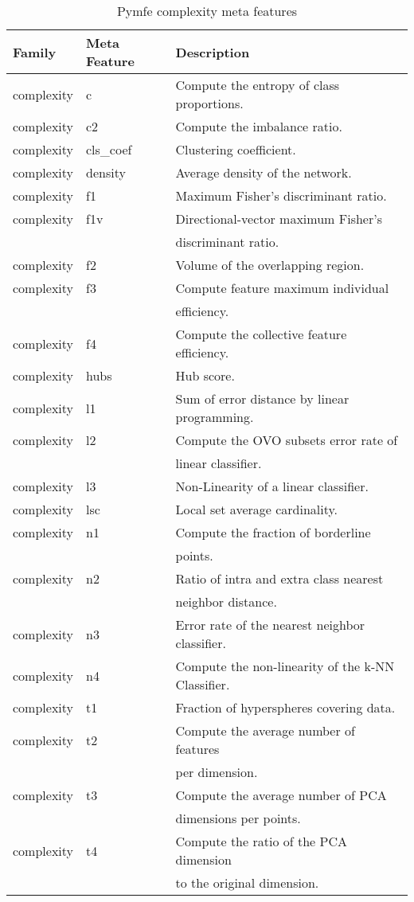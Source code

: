   \begin{table}[h!]
    \centering
    \caption{Pymfe complexity meta features}
    \setlength{\tabcolsep}{8pt}
      \renewcommand{\arraystretch}{1.2}
        \begin{tabular}{lll}
        \hline
        Family & Meta Feature & Description \\ \hline
      complexity & c & Compute the entropy of class proportions.\\
      complexity & c2 & Compute the imbalance ratio.\\
      complexity & cls\_coef & Clustering coefficient.\\
      complexity & density & Average density of the network.\\
      complexity & f1 & Maximum Fisher's discriminant ratio.\\
      complexity & f1v & Directional-vector maximum Fisher's \\ & & discriminant ratio.\\
      complexity & f2 & Volume of the overlapping region.\\
      complexity & f3 & Compute feature maximum individual \\ & & efficiency.\\
      complexity & f4 & Compute the collective feature efficiency.\\
      complexity & hubs & Hub score.\\
      complexity & l1 & Sum of error distance by linear programming.\\
      complexity & l2 & Compute the OVO subsets error rate of\\ & & linear classifier.\\
      complexity & l3 & Non-Linearity of a linear classifier.\\
      complexity & lsc & Local set average cardinality.\\
      complexity & n1 & Compute the fraction of borderline \\ & &points.\\
      complexity & n2 & Ratio of intra and extra class nearest\\ & & neighbor distance.\\
      complexity & n3 & Error rate of the nearest neighbor classifier.\\
      complexity & n4 & Compute the non-linearity of the k-NN Classifier.\\
      complexity & t1 & Fraction of hyperspheres covering data.\\
      complexity & t2 & Compute the average number of features \\ & &per dimension.\\
      complexity & t3 & Compute the average number of PCA \\ & &dimensions per points.\\
      complexity & t4 & Compute the ratio of the PCA dimension \\ & & to the original dimension.\\\hline
    \end{tabular}
    \label{tab:pymfe-complexity-mf}
  \end{table}